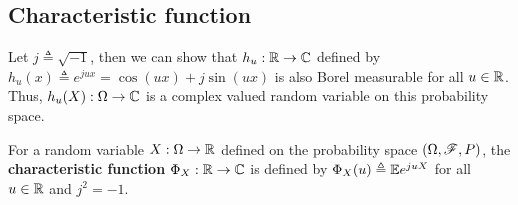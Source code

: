 \documentclass[letterpaper,10pt,english]{article}
\begin{document}
\subsection{Characteristic function}
\begin{shaded}
\begin{exmp} 
Let $j \triangleq \sqrt{-1}$, 
then we can show that $h_u: \mathbb{R} \to \mathbb{C}$ defined by $h_u(x) \triangleq e^{ju x} = \cos(u x) + j \sin(u x)$ is also Borel measurable for all $u \in \mathbb{R}$.  
Thus, $h_u(X):\Omega \to \mathbb{C}$ is a complex valued random variable on this probability space.  
\end{exmp} 
\end{shaded}
\begin{defn}%
For a random variable $X: \Omega \to \mathbb{R}$ defined on the probability space $(\Omega, \mathscr{F}, P)$, 
the \textbf{characteristic function} $\Phi_X: \mathbb{R} \to \mathbb{C}$ is defined by $\Phi_X(u) \triangleq \mathbb{E} e^{j u X}$ for all $u \in \mathbb{R}$ and $j^2 = -1$. 
\end{defn}
%
\end{document}
